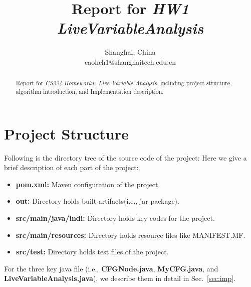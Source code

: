 \documentclass[conference]{IEEEtran}
\begin{document}
\title{Report for \textit{HW1 LiveVariableAnalysis}}


\author{
Shanghai, China\\
caohch1@shanghaitech.edu.cn}


\maketitle
\begin{abstract}
    Report for \textit{CS224 Homework1: Live Variable Analysis}, including project structure, algorithm introduction, and Implementation description.
\end{abstract}

\section{Project Structure}
Following is the directory tree of the source code of the project:
Here we give a brief description of each part of the project:
\begin{itemize}
    \item \textbf{pom.xml: } Maven configuration of the project.
    \item \textbf{out: } Directory holds built artifacts(i.e., jar package).
    \item \textbf{src/main/java/indi: } Directory holds key codes for the project.
    \item \textbf{src/main/resources: } Directory holds resource files like MANIFEST.MF.
    \item \textbf{src/test: } Directory holds test files of the project.
\end{itemize}

For the three key java file (i.e., \textbf{CFGNode.java}, \textbf{MyCFG.java}, and \textbf{LiveVariableAnalysis.java}), we describe them in detail in Sec.~\ref{sec:imp}.
\end{document}
